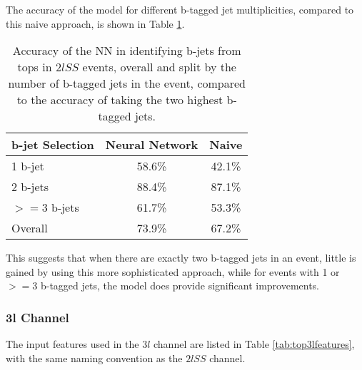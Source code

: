 The accuracy of the model for different b-tagged jet multiplicities, compared to this naive approach, is shown in Table \ref{tab:topMatchAcc2lSS}.

\begin{table}[H]
  \centering
  \begin{tabular}{|l|c|c|}
    \hline\hline
    b-jet Selection & Neural Network & Naive \\
    \hline
    1 b-jet & 58.6\% & 42.1\% \\
    2 b-jets & 88.4\% & 87.1\% \\
    $>=$3 b-jets & 61.7\% & 53.3\% \\
    \hline
    Overall & 73.9\% & 67.2\% \\                                                                                  
    \hline                                                                                                 
  \end{tabular}
  \caption{Accuracy of the NN in identifying b-jets from tops in $2lSS$ events, overall and split by the number of b-tagged jets in the event, compared to the accuracy of taking the two highest b-tagged jets.}     
  \label{tab:topMatchAcc2lSS}                                                                                           
\end{table}

This suggests that when there are exactly two b-tagged jets in an event, little is gained by using this more sophisticated approach, while for events with 1 or $>=3$ b-tagged jets, the model does provide significant improvements.

\subsubsection{3l Channel}
\label{subsec:top3l}
 
The input features used in the $3l$  channel are listed in Table \ref{tab:top3lfeatures}, with the same naming convention as the $2lSS$ channel.

